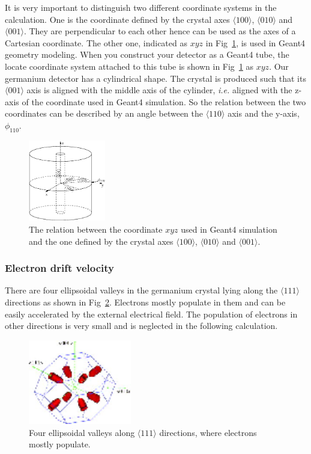It is very important to distinguish two different coordinate systems in the calculation. One is the coordinate defined by the crystal axes $\langle100\rangle$, $\langle010\rangle$ and $\langle001\rangle$. They are perpendicular to each other hence can be used as the axes of a Cartesian coordinate. The other one, indicated as $xyz$ in Fig~\ref{fig:coo}, is used in Geant4 geometry modeling. When you construct your detector as a Geant4 tube, the locate coordinate system attached to this tube is shown in Fig~\ref{fig:coo} as $xyz$. Our germanium detector has a cylindrical shape. The crystal is produced such that its $\langle001\rangle$ axis is aligned with the middle axis of the cylinder, \textit{i.e.} aligned with the z-axis of the coordinate used in Geant4 simulation. So the relation between the two coordinates can be described by an angle between the $\langle110\rangle$ axis and the y-axis, $\phi_{110}$.
\begin{figure}[htpb]
  \centering
  \includegraphics[width=0.3\textwidth]{coordins}  
  \caption{The relation between the coordinate $xyz$ used in Geant4     simulation and the one defined by the crystal axes     $\langle100\rangle$, $\langle010\rangle$ and $\langle001\rangle$.}
  \label{fig:coo}
\end{figure}

\subsubsection{Electron drift velocity}
\label{sec:elec}
There are four ellipsoidal valleys in the germanium crystal lying along the $\langle111\rangle$ directions as shown in Fig~\ref{fig:valley}. Electrons mostly populate in them and can be easily accelerated by the external electrical field. The population of electrons in other directions is very small and is neglected in the following calculation.
\begin{figure}
  \centering
  \includegraphics[width=0.4\textwidth]{valleys}  
  \caption{Four ellipsoidal valleys along $\langle111\rangle$     directions, where electrons mostly populate.}
  \label{fig:valley}
\end{figure}

